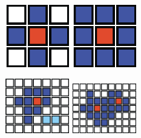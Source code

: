 \begin{figure}[t!]
\centering
\includegraphics[width=0.25\textwidth]{figures/seed_4neighbours.png}
\includegraphics[width=0.25\textwidth]{figures/seed_8neighbours.png}

\centering
\includegraphics[width=0.25\textwidth]{figures/topological_cluster_oneseed.png}
\includegraphics[width=0.25\textwidth]{figures/topological_cluster_many_Seeds.png}


\end{figure}
